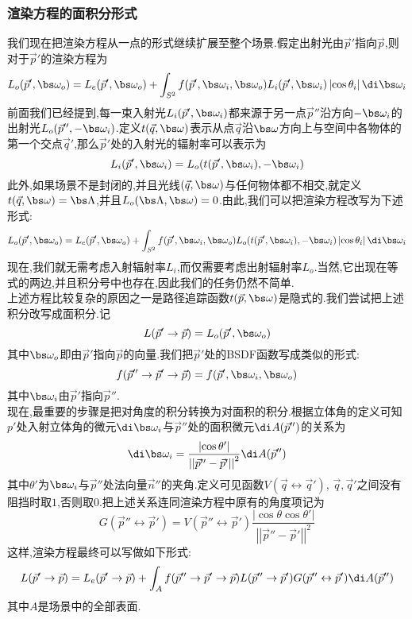 \documentclass{ctexart}
\begin{document}
\subsubsection{渲染方程的面积分形式}
我们现在把渲染方程从一点的形式继续扩展至整个场景.假定出射光由$\vec{p}'$指向$\vec{p}$,则对于$\vec{p}'$的渲染方程为
\[L_o(\vec{p}',\bs\omega_o)=L_e(\vec{p}',\bs\omega_o)+\int_{S^2}f(\vec{p}',\bs\omega_i,\bs\omega_o)L_i(\vec{p}',\bs\omega_i)\left|\cos\theta_i\right|\di\bs\omega_i\]
前面我们已经提到,每一束入射光$L_i(\vec{p}',\bs\omega_i)$都来源于另一点$\vec{p}''$沿方向$-\bs\omega_i$的出射光$L_o(\vec{p}'',-\bs\omega_i)$.定义$t(\vec{q},\bs\omega)$表示从点$\vec{q}$沿$\bs\omega$方向上与空间中各物体的第一个交点$\vec{q}'$,那么$\vec{p}'$处的入射光的辐射率可以表示为
\[L_i(\vec{p}',\bs\omega_i)=L_o(t(\vec{p}',\bs\omega_i),-\bs\omega_i)\]
此外,如果场景不是封闭的,并且光线$(\vec{q},\bs\omega)$与任何物体都不相交,就定义$t(\vec{q},\bs\omega)=\bs\Lambda$,并且$L_o(\bs\Lambda,\bs\omega)=0$.由此,我们可以把渲染方程改写为下述形式:
\[L_o(\vec{p}',\bs\omega_o)=L_e(\vec{p}',\bs\omega_o)+\int_{S^2}f(\vec{p}',\bs\omega_i,\bs\omega_o)L_o(t(\vec{p}',\bs\omega_i),-\bs\omega_i)\left|\cos\theta_i\right|\di\bs\omega_i\]
现在,我们就无需考虑入射辐射率$L_i$,而仅需要考虑出射辐射率$L_o$.当然,它出现在等式的两边,并且积分号中也存在,因此我们的任务仍然不简单.\\
\indent 上述方程比较复杂的原因之一是路径追踪函数$t(\vec{p},\bs\omega)$是隐式的.我们尝试把上述积分改写成面积分.记
\[L(\vec{p}'\to\vec{p})=L_{o}(\vec{p}',\bs\omega_o)\]
其中$\bs\omega_o$即由$\vec{p}'$指向$\vec{p}$的向量.我们把$\vec{p}'$处的BSDF函数写成类似的形式:
\[f(\vec{p}''\to\vec{p}'\to\vec{p})=f(\vec{p}',\bs\omega_i,\bs\omega_o)\]
其中$\bs\omega_i$由$\vec{p}'$指向$\vec{p}''$.\\
\indent 现在,最重要的步骤是把对角度的积分转换为对面积的积分.根据立体角的定义可知$p'$处入射立体角的微元$\di\bs\omega_i$与$\vec{p}''$处的面积微元$\di A(\vec{p}'')$的关系为
\[\di\bs\omega_i=\dfrac{\left|\cos\theta'\right|}{\left|\left|\vec{p}''-\vec{p}'\right|\right|^2}\di A(\vec{p}'')\]
其中$\theta'$为$\bs\omega_i$与$\vec{p}''$处法向量$\vec{n}''$的夹角.定义可见函数$V(\vec{q}\leftrightarrow\vec{q}')$, $\vec{q},\vec{q}'$之间没有阻挡时取$1$,否则取$0$.把上述关系连同渲染方程中原有的角度项记为
\[G(\vec{p}''\leftrightarrow\vec{p}')=V(\vec{p}''\leftrightarrow\vec{p}')\dfrac{\left|\cos\theta\cos\theta'\right|}{\left|\left|\vec{p}''-\vec{p}'\right|\right|^2}\]
这样,渲染方程最终可以写做如下形式:
\[L(\vec{p}'\to\vec{p})=L_e(\vec{p}'\to\vec{p})+\int_{A}f(\vec{p}''\to\vec{p}'\to\vec{p})L(\vec{p}''\to\vec{p}')G(\vec{p}''\leftrightarrow\vec{p}')\di A(\vec{p}'')\]
其中$A$是场景中的全部表面.
\end{document}
